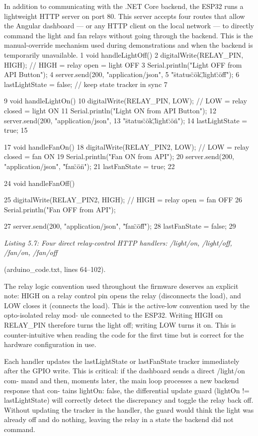 In addition to communicating with the .NET Core backend, the ESP32 runs a lightweight
HTTP server on port 80. This server accepts four routes that allow the Angular dashboard
--- or any HTTP client on the local network --- to directly command the light and fan relays
without going through the backend. This is the manual-override mechanism used during
demonstrations and when the backend is temporarily unavailable.
1 void handleLightOff() {
2 digitalWrite(RELAY\_PIN, HIGH); // HIGH = relay open = light OFF
3 Serial.println("Light OFF from API Button");
4 server.send(200, "application/json",
5 "{\"status\":\"ok\",\"light\":\"off\"}");
6 lastLightState = false; // keep state tracker in sync
7 }

9 void handleLightOn() {
10 digitalWrite(RELAY\_PIN, LOW); // LOW = relay closed = light ON
11 Serial.println("Light ON from API Button");
12 server.send(200, "application/json",
13 "{\"status\":\"ok\",\"light\":\"on\"}");
14 lastLightState = true;
15 }

17 void handleFanOn() {
18 digitalWrite(RELAY\_PIN2, LOW); // LOW = relay closed = fan ON
19 Serial.println("Fan ON from API");
20 server.send(200, "application/json", "{\"fan\":\"on\"}");
21 lastFanState = true;
22 }

24 void handleFanOff() {
25 digitalWrite(RELAY\_PIN2, HIGH); // HIGH = relay open = fan OFF
26 Serial.println("Fan OFF from API");




27 server.send(200, "application/json", "{\"fan\":\"off\"}");
28 lastFanState = false;
29 }


\textit{Listing 5.7: Four direct relay-control HTTP handlers: /light/on, /light/off, /fan/on, /fan/off}

(arduino\_code.txt, lines 64--102).


The relay logic convention used throughout the ﬁrmware deserves an explicit note:
HIGH on a relay control pin opens the relay (disconnects the load), and LOW closes it
(connects the load). This is the active-low convention used by the opto-isolated relay mod-
ule connected to the ESP32. Writing HIGH on RELAY\_PIN therefore turns the light off;
writing LOW turns it on. This is counter-intuitive when reading the code for the ﬁrst time
but is correct for the hardware conﬁguration in use.

Each handler updates the lastLightState or lastFanState tracker immediately
after the GPIO write. This is critical: if the dashboard sends a direct /light/on com-
mand and then, moments later, the main loop processes a new backend response that con-
tains lightOn: false, the differential update guard (lightOn != lastLightState)
will correctly detect the discrepancy and toggle the relay back off. Without updating the
tracker in the handler, the guard would think the light was already off and do nothing,
leaving the relay in a state the backend did not command.

